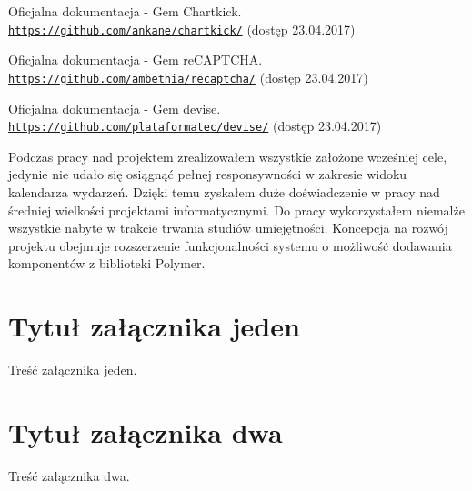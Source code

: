 \documentclass[openright]{xmgr}
\begin{document}
\begin{thebibliography}{9}
Oficjalna dokumentacja - Gem Chartkick.
\\\texttt{\url{https://github.com/ankane/chartkick/}} (dostęp 23.04.2017)

Oficjalna dokumentacja - Gem reCAPTCHA.
\\\texttt{\url{https://github.com/ambethia/recaptcha/}} (dostęp 23.04.2017)

Oficjalna dokumentacja - Gem devise.
\\\texttt{\url{https://github.com/plataformatec/devise/}} (dostęp 23.04.2017)

\end{thebibliography} 


\summary
Podczas pracy nad projektem zrealizowałem wszystkie założone wcześniej cele, jedynie nie udało się osiągnąć pełnej responsywności w zakresie widoku kalendarza wydarzeń. Dzięki temu zyskałem duże doświadczenie w pracy nad średniej wielkości projektami informatycznymi. Do pracy wykorzystałem niemalże wszystkie nabyte w trakcie trwania studiów umiejętności. Koncepcja na rozwój projektu obejmuje rozszerzenie funkcjonalności systemu o możliwość dodawania komponentów z biblioteki Polymer. 

\appendix
\chapter{Tytuł załącznika jeden}

Treść załącznika jeden.

\chapter{Tytuł załącznika dwa}

Treść załącznika dwa.

\listoffigures

\lstlistoflistings
{}%

\oswiadczenie
\end{document}
